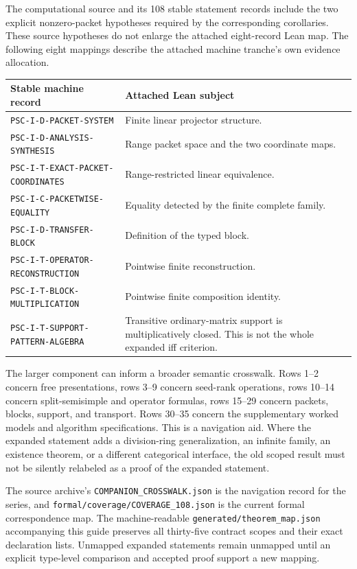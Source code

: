 \documentclass[11pt,a4paper]{article}
\newcommand{\code}[1]{\nolinkurl{#1}}
\begin{document}
The computational source and its 108 stable statement records include the two explicit nonzero-packet hypotheses required by the corresponding corollaries. These source hypotheses do not enlarge the attached eight-record Lean map. The following eight mappings describe the attached machine tranche's own evidence allocation.

\begin{longtable}{p{}p{}}
\toprule Stable machine record & Attached Lean subject \\\midrule\endhead
\code{PSC-I-D-PACKET-SYSTEM} & Finite linear projector structure. \\
\code{PSC-I-D-ANALYSIS-SYNTHESIS} & Range packet space and the two coordinate maps. \\
\code{PSC-I-T-EXACT-PACKET-COORDINATES} & Range-restricted linear equivalence. \\
\code{PSC-I-C-PACKETWISE-EQUALITY} & Equality detected by the finite complete family. \\
\code{PSC-I-D-TRANSFER-BLOCK} & Definition of the typed block. \\
\code{PSC-I-T-OPERATOR-RECONSTRUCTION} & Pointwise finite reconstruction. \\
\code{PSC-I-T-BLOCK-MULTIPLICATION} & Pointwise finite composition identity. \\
\code{PSC-I-T-SUPPORT-PATTERN-ALGEBRA} & Transitive ordinary-matrix support is multiplicatively closed. This is not the whole expanded iff criterion. \\
\bottomrule
\end{longtable}

The larger component can inform a broader semantic crosswalk. Rows 1--2 concern free presentations, rows 3--9 concern seed-rank operations, rows 10--14 concern split-semisimple and operator formulas, rows 15--29 concern packets, blocks, support, and transport. Rows 30--35 concern the supplementary worked models and algorithm specifications. This is a navigation aid. Where the expanded statement adds a division-ring generalization, an infinite family, an existence theorem, or a different categorical interface, the old scoped result must not be silently relabeled as a proof of the expanded statement.

The source archive's \code{COMPANION_CROSSWALK.json} is the navigation record for the series, and \code{formal/coverage/COVERAGE_108.json} is the current formal correspondence map. The machine-readable \code{generated/theorem_map.json} accompanying this guide preserves all thirty-five contract scopes and their exact declaration lists. Unmapped expanded statements remain unmapped until an explicit type-level comparison and accepted proof support a new mapping.
\end{document}
